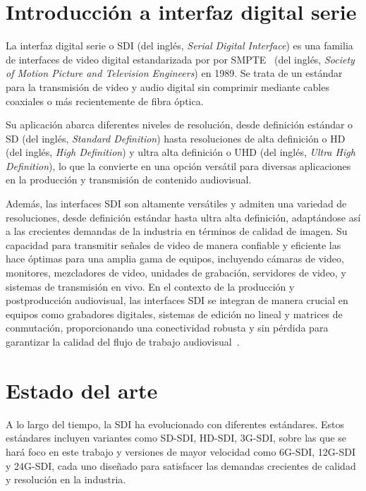 \section{Introducción a interfaz digital serie}

  La interfaz digital serie o SDI (del inglés, \textit{Serial Digital Interface})
  es una familia de interfaces de video digital estandarizada por
  por SMPTE~\citep{smpte} (del inglés, \textit{Society of Motion Picture and Television Engineers}) en
  1989. Se trata de un estándar para la transmisión de video y audio digital sin
  comprimir mediante cables coaxiales o más recientemente de fibra óptica.

  Su aplicación abarca diferentes niveles de resolución, desde definición
  estándar o SD (del inglés, \textit{Standard Definition}) hasta resoluciones de
  alta definición o HD (del inglés, \textit{High Definition}) y ultra alta
  definición o UHD (del inglés, \textit{Ultra High Definition}), lo que la convierte
  en una opción versátil para diversas aplicaciones en la producción y transmisión
  de contenido audiovisual.

  Además, las interfaces SDI son altamente versátiles y admiten una variedad de
  resoluciones, desde definición estándar hasta ultra alta definición, adaptándose
  así a las crecientes demandas de la industria en términos de calidad de imagen.
  Su capacidad para transmitir señales de video de manera confiable y eficiente
  las hace óptimas para una amplia gama de equipos, incluyendo cámaras de video,
  monitores, mezcladores de video, unidades de grabación, servidores de video, y
  sistemas de transmisión en vivo. En el contexto de la producción y
  postproducción audiovisual, las interfaces SDI se integran de manera crucial en
  equipos como grabadores digitales, sistemas de edición no lineal y matrices de
  conmutación, proporcionando una conectividad robusta y sin pérdida para
  garantizar la calidad del flujo de trabajo audiovisual~\citep{optcore}.

\section{Estado del arte}

  A lo largo del tiempo, la SDI ha evolucionado con diferentes estándares. Estos
  estándares incluyen variantes como SD-SDI, HD-SDI, 3G-SDI, sobre las que se
  hará foco en este trabajo y versiones de mayor velocidad como 6G-SDI, 12G-SDI
  y 24G-SDI, cada uno diseñado para satisfacer las demandas crecientes de calidad
  y resolución en la industria.

